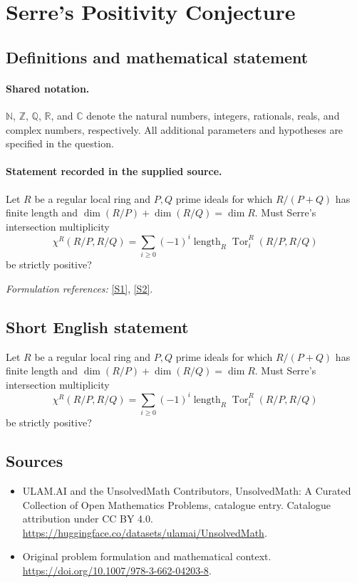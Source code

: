 \documentclass[11pt]{article}
\newcommand{\sref}[2]{\hyperlink{source:#1:#2}{[S#2]}}
\begin{document}
\section{Serre's Positivity Conjecture}\label{statement}

\subsection{Definitions and mathematical statement}

\paragraph{Shared notation.}$\mathbb N$, $\mathbb Z$, $\mathbb Q$, $\mathbb R$, and $\mathbb C$ denote the natural numbers, integers, rationals, reals, and complex numbers, respectively. All additional parameters and hypotheses are specified in the question.


\paragraph{Statement recorded in the supplied source.}
Let $R$ be a regular local ring and $P,Q$ prime ideals for which $R/(P+Q)$ has finite length and $\dim(R/P)+\dim(R/Q)=\dim R$. Must Serre's intersection multiplicity
\[\chi^R(R/P,R/Q)=\sum_{i\geq0}(-1)^i\operatorname{length}_R\operatorname{Tor}_i^R(R/P,R/Q)\]
be strictly positive?
\par\smallskip\textit{Formulation references:} \sref{statement}{1}, \sref{statement}{2}.
\subsection{Short English statement}
Let $R$ be a regular local ring and $P,Q$ prime ideals for which $R/(P+Q)$ has finite length and $\dim(R/P)+\dim(R/Q)=\dim R$. Must Serre's intersection multiplicity
\[\chi^R(R/P,R/Q)=\sum_{i\geq0}(-1)^i\operatorname{length}_R\operatorname{Tor}_i^R(R/P,R/Q)\]
be strictly positive?
\subsection{Sources}
\begin{itemize}
\item[\hypertarget{source:statement:1}{S1}] ULAM.AI and the UnsolvedMath Contributors, UnsolvedMath: A Curated Collection of Open Mathematics Problems, catalogue entry. Catalogue attribution under CC BY 4.0.
\url{https://huggingface.co/datasets/ulamai/UnsolvedMath}.
\item[\hypertarget{source:statement:2}{S2}] Original problem formulation and mathematical context.
\url{https://doi.org/10.1007/978-3-662-04203-8}.
\end{itemize}
\label{end:statement}
\end{document}
